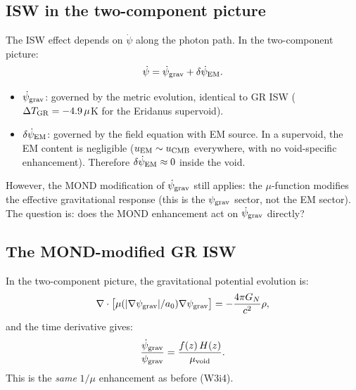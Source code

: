 \documentclass[11pt]{article}
\newcommand{\GN}{G_N}
\newcommand{\mufd}{\mu}
\begin{document}
\subsection{ISW in the two-component picture}

The ISW effect depends on $\dot\psi$ along the photon path. In the
two-component picture:
\begin{equation}
  \dot\psi = \dot\psi_{\rm grav} + \delta\dot\psi_{\rm EM}.
\end{equation}
\begin{itemize}[nosep]
  \item $\dot\psi_{\rm grav}$: governed by the metric evolution, identical
    to GR ISW ($\Delta T_{\rm GR} = -4.9\,\mu$K for the Eridanus supervoid).
  \item $\delta\dot\psi_{\rm EM}$: governed by the field equation with EM
    source. In a supervoid, the EM content is negligible ($u_{\rm EM} \sim
    u_{\rm CMB}$ everywhere, with no void-specific enhancement). Therefore
    $\delta\dot\psi_{\rm EM} \approx 0$ inside the void.
\end{itemize}

However, the MOND modification of $\dot\psi_{\rm grav}$ still applies:
the $\mufd$-function modifies the effective gravitational response
(this is the $\psi_{\rm grav}$ sector, not the EM sector). The question
is: does the MOND enhancement act on $\dot\psi_{\rm grav}$ directly?

\subsection{The MOND-modified GR ISW}

In the two-component picture, the gravitational potential evolution is:
\begin{equation}
  \nabla\cdot\bigl[\mufd(|\nabla\psi_{\rm grav}|/a_0)\nabla\psi_{\rm grav}\bigr]
  = -\frac{4\pi \GN}{c^2}\rho,
\end{equation}
and the time derivative gives:
\begin{equation}
  \frac{\dot\psi_{\rm grav}}{\psi_{\rm grav}} = \frac{f(z)\,H(z)}{\mufd_{\rm void}}.
\end{equation}
This is the \emph{same} $1/\mufd$ enhancement as before (W3i4).
\end{document}
